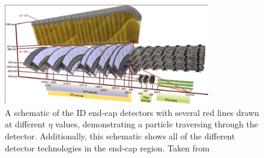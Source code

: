 \begin{figure}
    \centering
    \includegraphics[width=0.8\textwidth]{figures/atlas/atlas_ID_endcap.png}
    \caption{A schematic of the ID end-cap detectors with several red lines drawn at different $\eta$ values, demonstrating a particle traversing through the detector. Additionally, this schematic shows all of the different detector technologies in the end-cap region. Taken from~\cite{atlas_inner_detector_endcap_image}}\label{fig:atlas_id_endcap}
\end{figure}
